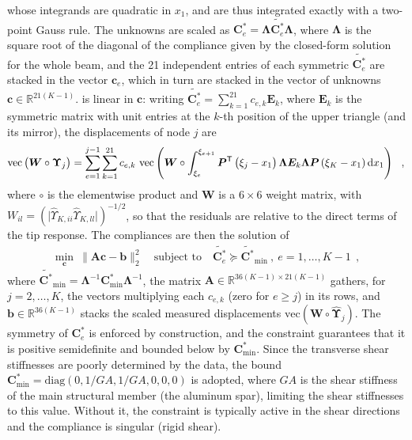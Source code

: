 \documentclass[journal]{new-aiaa}
\newcommand{\vect}[1]{\bm{#1}}
\def\tens#1{\bm{#1}}
\def\lp{\left(}
\def\rp{\right)}
\def\T{\mathsf{T}}
\def\Flex{\mathcal{\tens{C}}^*}
\def\Flexe{\Flex_e}
\begin{document}
whose integrands are quadratic in $x_1$, and are thus integrated exactly with a two-point Gauss rule. The unknowns are scaled as $\Flexe=\tens{\Lambda}\tilde{\Flexe}\tens{\Lambda}$, where $\tens{\Lambda}$ is the square root of the diagonal of the compliance given by the closed-form solution for the whole beam, and the 21 independent entries of each symmetric $\tilde{\Flexe}$ are stacked in the vector $\vect{c}_e$, which in turn are stacked in the vector of unknowns $\vect{c}\in\mathbb{R}^{21\lp K-1\rp}$.  is linear in $\vect{c}$: writing $\tilde{\Flexe}=\sum_{k=1}^{21}c_{e,k}\tens{E}_k$, where $\tens{E}_k$ is the symmetric matrix with unit entries at the $k$-th position of the upper triangle (and its mirror), the displacements of node $j$ are
\begin{align}
    \mathrm{vec}\lp\tens{W}\circ\tens{\Upsilon}_j\rp = \sum_{e=1}^{j-1}\sum_{k=1}^{21} c_{e,k} \ \mathrm{vec}\lp\tens{W}\circ\int_{\xi_e}^{\xi_{e+1}} \tens{P}^\T\lp\xi_j-x_1\rp \tens{\Lambda}\tens{E}_k\tens{\Lambda} \tens{P}\lp\xi_K-x_1\rp \dif x_1\rp \ \ ,
\end{align}
where $\circ$ is the elementwise product and $\tens{W}$ is a $6\times6$ weight matrix, with $W_{il}=\lp\big|\hat\Upsilon_{K,ii}\hat\Upsilon_{K,ll}\big|\rp^{-1/2}$, so that the residuals are relative to the direct terms of the tip response. The compliances are then the solution of
\begin{align}
    \min_{\vect{c}} \ \big\|\tens{A}\vect{c}-\vect{b}\big\|_2^2
    \quad \text{subject to} \quad \tilde{\Flexe} \succeq \tilde{\Flex}_{\min} \ , \ e=1,\dots,K-1 \ \ ,
    \label{eq:ls}
\end{align}
where $\tilde{\Flex}_{\min}=\tens{\Lambda}^{-1}\Flex_{\min}\tens{\Lambda}^{-1}$, the matrix $\tens{A} \in \mathbb{R}^{36 (K-1) \times 21\lp K-1\rp}$ gathers, for $j=2,\dots,K$, the vectors multiplying each $c_{e,k}$ (zero for $e\ge j$) in its rows, and $\vect{b} \in \mathbb{R}^{36 (K-1)}$ stacks the scaled measured displacements $\mathrm{vec}\lp\tens{W}\circ\hat{\tens{\Upsilon}}_j\rp$. The symmetry of $\Flexe$ is enforced by construction, and the constraint guarantees that it is positive semidefinite and bounded below by $\Flex_{\min}$. Since the transverse shear stiffnesses are poorly determined by the data, the bound $\Flex_{\min}=\mathrm{diag}\lp0,1/GA,1/GA,0,0,0\rp$ is adopted, where $GA$ is the shear stiffness of the main structural member (the aluminum spar), limiting the shear stiffnesses to this value. Without it, the constraint is typically active in the shear directions and the compliance is singular (rigid shear).
\end{document}
